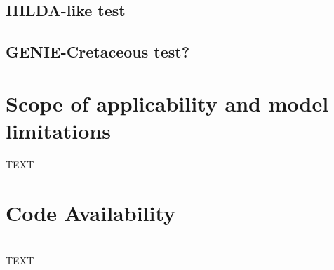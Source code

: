 \documentclass[gmd, manuscript]{copernicus}
\begin{document}
\subsection{HILDA-like test}

\subsection{GENIE-Cretaceous test?}

\section{Scope of applicability and model limitations}



\conclusions  %
TEXT

\section {Code Availability}


\appendix
\section{}    %

\subsection{}                               %




\begin{acknowledgements}
TEXT
\end{acknowledgements}




\newpage



\end{document}
